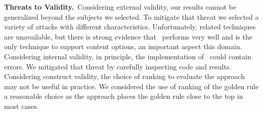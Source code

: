 \documentclass[conference]{IEEEtran}
\begin{document}
\noindent\textbf{Threats to Validity.}~Considering external validity, 
our results cannot be generalized beyond the subjects we selected. To 
mitigate that threat we selected a variety of attacks with different
characteristics. Unfortunately, related techniques are unavailable, 
but there is strong evidence that \tname\ performs very
well and is the only technique to support content options, an important 
aspect this domain. Considering internal validity, in
principle, the implementation of \tname\ could contain errors. We
mitigated that threat by carefully inspecting code and
results. Considering construct validity, the choice of ranking to
evaluate the approach may not be useful in practice. We considered the
use of ranking of the golden rule a reasonable choice as the approach
places the golden rule close to the top in most cases.




\end{document}
